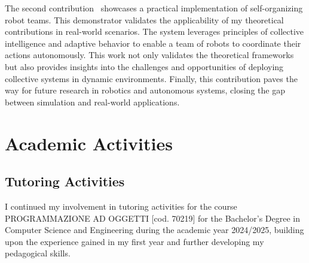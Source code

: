 \documentclass[runningheads]{llncs}
\begin{document}
The second contribution~\cite{DBLP:conf/coordination/AguzziBBCCDFPV25} showcases a practical implementation of self-organizing robot teams.
%
This demonstrator validates the applicability of my theoretical contributions in real-world scenarios.
%
The system leverages principles of collective intelligence and adaptive behavior to enable a team of robots to coordinate their actions autonomously.
%
This work not only validates the theoretical frameworks but also provides insights into the challenges and opportunities of deploying collective systems in dynamic environments.
%
Finally,
this contribution paves the way for future research in robotics and autonomous systems,
closing the gap between simulation and real-world applications.




\section{Academic Activities}

\subsection{Tutoring Activities}

I continued my involvement in tutoring activities for the course PROGRAMMAZIONE AD OGGETTI [cod. 70219] for the Bachelor's Degree in Computer Science and Engineering during the academic year 2024/2025, building upon the experience gained in my first year and further developing my pedagogical skills.
\end{document}
